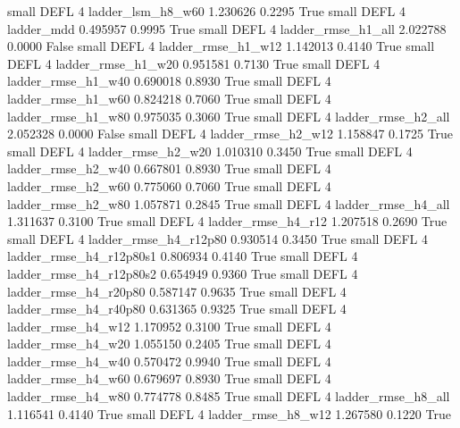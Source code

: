     small     DEFL                 4        ladder_lsm_h8_w60   1.230626      0.2295    True
     small     DEFL                 4               ladder_mdd   0.495957      0.9995    True
     small     DEFL                 4       ladder_rmse_h1_all   2.022788      0.0000   False
     small     DEFL                 4       ladder_rmse_h1_w12   1.142013      0.4140    True
     small     DEFL                 4       ladder_rmse_h1_w20   0.951581      0.7130    True
     small     DEFL                 4       ladder_rmse_h1_w40   0.690018      0.8930    True
     small     DEFL                 4       ladder_rmse_h1_w60   0.824218      0.7060    True
     small     DEFL                 4       ladder_rmse_h1_w80   0.975035      0.3060    True
     small     DEFL                 4       ladder_rmse_h2_all   2.052328      0.0000   False
     small     DEFL                 4       ladder_rmse_h2_w12   1.158847      0.1725    True
     small     DEFL                 4       ladder_rmse_h2_w20   1.010310      0.3450    True
     small     DEFL                 4       ladder_rmse_h2_w40   0.667801      0.8930    True
     small     DEFL                 4       ladder_rmse_h2_w60   0.775060      0.7060    True
     small     DEFL                 4       ladder_rmse_h2_w80   1.057871      0.2845    True
     small     DEFL                 4       ladder_rmse_h4_all   1.311637      0.3100    True
     small     DEFL                 4       ladder_rmse_h4_r12   1.207518      0.2690    True
     small     DEFL                 4    ladder_rmse_h4_r12p80   0.930514      0.3450    True
     small     DEFL                 4  ladder_rmse_h4_r12p80s1   0.806934      0.4140    True
     small     DEFL                 4  ladder_rmse_h4_r12p80s2   0.654949      0.9360    True
     small     DEFL                 4    ladder_rmse_h4_r20p80   0.587147      0.9635    True
     small     DEFL                 4    ladder_rmse_h4_r40p80   0.631365      0.9325    True
     small     DEFL                 4       ladder_rmse_h4_w12   1.170952      0.3100    True
     small     DEFL                 4       ladder_rmse_h4_w20   1.055150      0.2405    True
     small     DEFL                 4       ladder_rmse_h4_w40   0.570472      0.9940    True
     small     DEFL                 4       ladder_rmse_h4_w60   0.679697      0.8930    True
     small     DEFL                 4       ladder_rmse_h4_w80   0.774778      0.8485    True
     small     DEFL                 4       ladder_rmse_h8_all   1.116541      0.4140    True
     small     DEFL                 4       ladder_rmse_h8_w12   1.267580      0.1220    True
